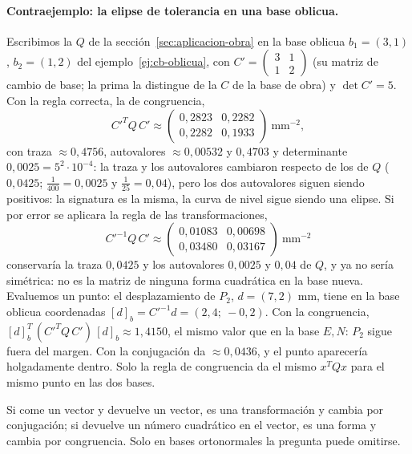 \paragraph{Contraejemplo: la elipse de tolerancia en una base oblicua.} Escribimos la \(Q\)
de la sección~\ref{sec:aplicacion-obra} en la base oblicua \(b_1=(3,1)\), \(b_2=(1,2)\) del
ejemplo~\ref{ej:cb-oblicua}, con \(C'=\left(\begin{smallmatrix}3&1\\1&2\end{smallmatrix}\right)\)
(su matriz de cambio de base; la prima la distingue de la \(C\) de la base de obra)
y \(\det C'=5\). Con la regla correcta, la de congruencia,
\[
  C'^TQ\,C'\approx\begin{pmatrix}0{,}2823&0{,}2282\\0{,}2282&0{,}1933\end{pmatrix}\ \text{mm}^{-2},
\]
con traza \(\approx0{,}4756\), autovalores \(\approx0{,}00532\) y \(0{,}4703\) y determinante
\(0{,}0025=5^2\cdot10^{-4}\): la traza y los autovalores cambiaron respecto de los de \(Q\)
(\(0{,}0425\); \(\tfrac1{400}=0{,}0025\) y \(\tfrac1{25}=0{,}04\)), pero los dos autovalores
siguen siendo positivos: la signatura es la misma, la curva de nivel sigue siendo una elipse.
Si por error se aplicara la regla de las transformaciones,
\[
  C'^{-1}Q\,C'\approx\begin{pmatrix}0{,}01083&0{,}00698\\0{,}03480&0{,}03167\end{pmatrix}\ \text{mm}^{-2}
\]
conservaría la traza \(0{,}0425\) y los autovalores \(0{,}0025\) y \(0{,}04\) de \(Q\), y ya
no sería simétrica: no es la matriz de ninguna forma cuadrática en la base nueva. Evaluemos un
punto: el desplazamiento de \(P_2\), \(d=(7,2)\) mm, tiene en la base
oblicua coordenadas \([d]_{b}=C'^{-1}d=(2{,}4;\ -0{,}2)\). Con la congruencia,
\([d]_b^T\,(C'^TQ\,C')\,[d]_b\approx1{,}4150\), el mismo valor que en la base \(E,N\): \(P_2\)
sigue fuera del margen. Con la conjugación da \(\approx0{,}0436\), y el punto aparecería
holgadamente dentro. Solo la regla de congruencia da el mismo \(x^TQx\) para el mismo punto en
las dos bases.

\begin{idea}
Si come un vector y devuelve un vector, es una transformación y cambia por conjugación; si
devuelve un número cuadrático en el vector, es una forma y cambia por congruencia. Solo en
bases ortonormales la pregunta puede omitirse.
\end{idea}

